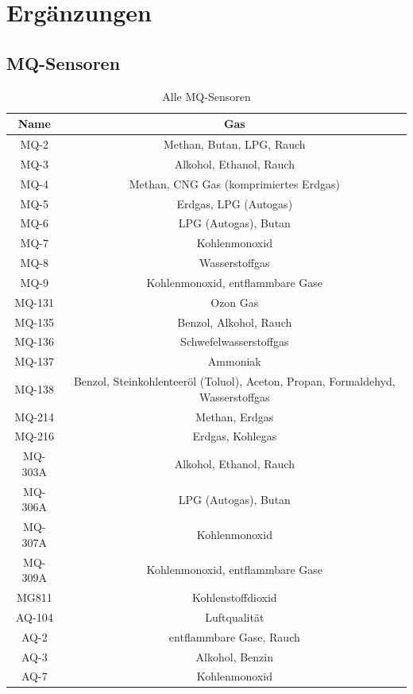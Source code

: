 \documentclass[10pt]{article}
\begin{document}
\newpage

\printbibliography[heading=bibintoc, title={Quellen- und Literaturverzeichnis}]

\appendix

\section{Ergänzungen}
\subsection{MQ-Sensoren}

\begin{table}[H]
\centering
{}
\begin{tabular}{cc}
Name & Gas \\
\hline
MQ-2 & Methan, Butan, LPG, Rauch \\
MQ-3 & Alkohol, Ethanol, Rauch \\
MQ-4 & Methan, CNG Gas (komprimiertes Erdgas) \\
MQ-5 & Erdgas, LPG (Autogas) \\
MQ-6 & LPG (Autogas), Butan \\
MQ-7 & Kohlenmonoxid \\
MQ-8 & Wasserstoffgas \\
MQ-9 & Kohlenmonoxid, entflammbare Gase \\
MQ-131 & Ozon Gas \\
MQ-135 & Benzol, Alkohol, Rauch\\
MQ-136 & Schwefelwasserstoffgas\\
MQ-137 &  Ammoniak\\
MQ-138 &  Benzol, Steinkohlenteeröl (Toluol), Aceton, Propan, Formaldehyd, Wasserstoffgas\\
MQ-214 &  Methan, Erdgas\\
MQ-216 & Erdgas, Kohlegas\\
MQ-303A &  Alkohol, Ethanol, Rauch\\
MQ-306A &  LPG (Autogas), Butan\\
MQ-307A &  Kohlenmonoxid\\
MQ-309A &  Kohlenmonoxid, entflammbare Gase\\
MG811 & Kohlenstoffdioxid\\
AQ-104 & Luftqualität\\
AQ-2 & entflammbare Gase, Rauch\\
AQ-3 & Alkohol, Benzin\\
AQ-7 & Kohlenmonoxid\\
\end{tabular}
\caption{Alle MQ-Sensoren}
\label{MQ-Tabelle}
\end{table}
\end{document}
